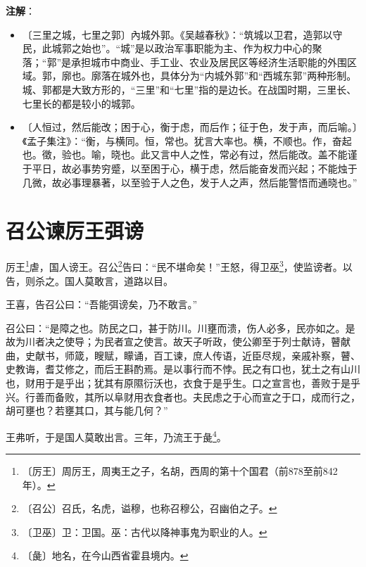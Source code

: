 \documentclass[12pt,UTF-8,openany]{ctexbook}
\begin{document}
\newpage

\textbf{注解}：

\vspace{-1em}

\begin{itemize}
    \setlength\itemsep{-0.2em}
    \item〔三里之城，七里之郭〕內城外郭。《吴越春秋》：“筑城以卫君，造郭以守民，此城郭之始也”。“城”是以政治军事职能为主、作为权力中心的聚落；“郭”是承担城市中商业、手工业、农业及居民区等经济生活职能的外围区域。郭，廓也。廓落在城外也，具体分为“内城外郭”和“西城东郭”两种形制。城、郭都是大致方形的，“三里”和“七里”指的是边长。在战国时期，三里长、七里长的都是较小的城郭。
    \item〔人恒过，然后能改；困于心，衡于虑，而后作；征于色，发于声，而后喻。〕《孟子集注》：“衡，与横同。恒，常也。犹言大率也。横，不顺也。作，奋起也。徵，验也。喻，晓也。此又言中人之性，常必有过，然后能改。盖不能谨于平日，故必事势穷蹙，以至困于心，横于虑，然后能奋发而兴起；不能烛于几微，故必事理暴著，以至验于人之色，发于人之声，然后能警悟而通晓也。”
\end{itemize}

\chapter{召公谏厉王弭谤}

\begin{normalsize}
    
    厉王\footnote{〔厉王〕周厉王，周夷王之子，名胡，西周的第十个国君（前878至前842年）。}虐，国人谤王。召公\footnote{〔召公〕召氏，名虎，谥穆，也称召穆公，召幽伯之子。}告曰：“民不堪命矣！”王怒，得卫巫\footnote{〔卫巫〕卫：卫国。巫：古代以降神事鬼为职业的人。}，使监谤者。以告，则杀之。国人莫敢言，道路以目。
    
    王喜，告召公曰：“吾能弭谤矣，乃不敢言。”
    
    召公曰：“是障之也。防民之口，甚于防川。川壅而溃，伤人必多，民亦如之。是故为川者决之使导；为民者宣之使言。故天子听政，使公卿至于列士献诗，瞽献曲，史献书，师箴，瞍赋，矇诵，百工谏，庶人传语，近臣尽规，亲戚补察，瞽、史教诲，耆艾修之，而后王斟酌焉。是以事行而不悖。民之有口也，犹土之有山川也，财用于是乎出；犹其有原隰衍沃也，衣食于是乎生。口之宣言也，善败于是乎兴。行善而备败，其所以阜财用衣食者也。夫民虑之于心而宣之于口，成而行之，胡可壅也？若壅其口，其与能几何？”
    
    王弗听，于是国人莫敢出言。三年，乃流王于彘\footnote{〔彘〕地名，在今山西省霍县境内。}。
\end{normalsize}
\end{document}
